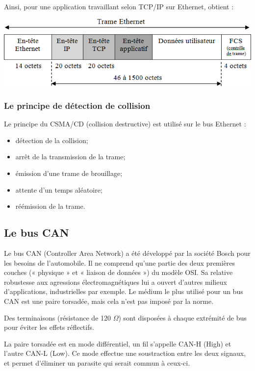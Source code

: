 \documentclass[10pt]{article}
\begin{document}
Ainsi, pour une application travaillant selon TCP/IP sur Ethernet, obtient :

\begin{center}
\includegraphics[width=.8\textwidth]{images/fig_16}
\end{center}

\subsubsection*{Le principe de détection de collision}
Le principe du CSMA/CD (collision destructive) est utilisé sur le bus Ethernet :
\begin{itemize}
\item détection de la collision;
\item arrêt de la transmission de la trame;
\item émission d’une trame de brouillage;
\item attente d’un temps aléatoire;
\item réémission de la trame.
\end{itemize}

\subsection{Le bus CAN}

Le bus CAN (Controller Area Network) a été développé par la société Bosch pour les besoins de l’automobile. Il ne comprend qu’une partie des deux premières couches (« physique » et « liaison de données ») du modèle OSI. Sa relative robustesse aux agressions électromagnétiques lui a ouvert d’autres milieux d’applications, industrielles par exemple.
Le médium le plus utilisé pour un bus CAN est une paire torsadée, mais cela n’est pas imposé par la norme.

Des terminaisons (résistance de 120 $\Omega$) sont disposées à chaque extrémité de bus pour éviter les effets réflectifs.

La paire torsadée est en mode différentiel, un fil s’appelle CAN-H (High) et l’autre CAN-L (Low). Ce mode effectue une soustraction entre les deux signaux, et permet d’éliminer un parasite qui serait commun à ceux-ci.
\end{document}
